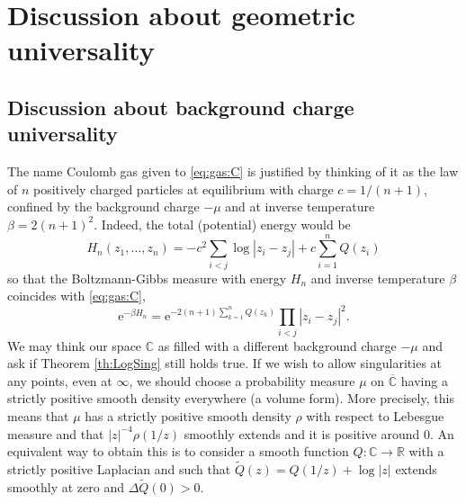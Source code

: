 \documentclass[10pt,reqno]{amsart}
\numberwithin{equation}{section}
\numberwithin{figure}{section}
\theoremstyle{plain}
\newcommand{\<}{\langle}
\renewcommand{\>}{\rangle}
\begin{document}
\section{Discussion about geometric universality}
\label{se:geometric}

\subsection{Discussion about background charge universality}
\label{se:Background}


The name Coulomb gas given to \eqref{eq:gas:C} 
is justified by thinking of it as
the law of $n$ positively charged particles at equilibrium with
charge $c=1/(n+1)$, confined by the 
background charge $-\mu$ and at inverse
temperature $\beta = 2(n+1)^2$. 
Indeed, the total (potential) energy would be
\[H_n(z_1,\dots,z_n) = 
-c^2 \sum_{i<j}  \log |z_i - z_j| + c\sum_{i=1}^n Q(z_i)\]
so that the Boltzmann-Gibbs measure with
energy $H_n$ and inverse temperature $\beta$ coincides with
\eqref{eq:gas:C},
\[\mathrm{e}^{-\beta H_n}
= \mathrm{e}^{-2(n+1)\sum_{k=1}^nQ(z_k)}\prod_{i<j}|z_i-z_j|^2.\]
We may think our space $\mathbb C$ as filled with
a different background charge $-\mu$ and ask if
Theorem \ref{th:LogSing} still holds true. 
If we wish to allow
singularities at any points, even at $\infty$, 
we should choose 
a  probability measure $\mu$ 
on $\overline{\mathbb C}$ having 
a strictly positive smooth density everywhere (a volume form). 
More precisely, this means that
$\mu$ has a strictly positive smooth
density $\rho$ with respect to Lebesgue measure
and that
$|z|^{-4}\rho(1/z)$ smoothly extends and 
it is positive
around $0$. An equivalent way to obtain this
is to consider a smooth function
$Q: \mathbb C \to \mathbb R$ with
a strictly positive Laplacian and such that
$\widetilde Q(z) = Q(1/z) + \log|z|$ extends
smoothly at zero and $\Delta \widetilde Q(0) > 0$.
\end{document}
